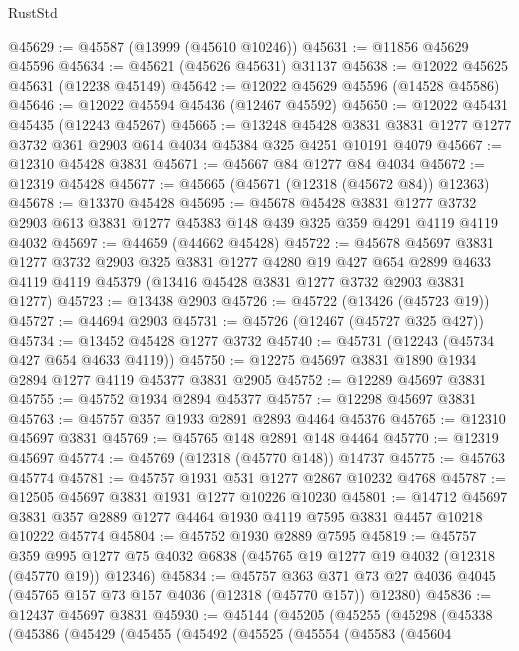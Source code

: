\begin{lexlean}{RustStd}
\begin{coremodule}
@45629 := @45587 (@13999 (@45610 @10246))
@45631 := @11856 @45629 @45596
@45634 := @45621 (@45626 @45631) @31137
@45638 := @12022 @45625 @45631 (@12238 @45149)
@45642 := @12022 @45629 @45596 (@14528 @45586)
@45646 := @12022 @45594 @45436 (@12467 @45592)
@45650 := @12022 @45431 @45435 (@12243 @45267)
@45665 := @13248
    @45428
    @3831
    @3831
    @1277
    @1277
    @3732
    @361
    @2903
    @614
    @4034
    @45384
    @325
    @4251
    @10191
    @4079
@45667 := @12310 @45428 @3831
@45671 := @45667 @84 @1277 @84 @4034
@45672 := @12319 @45428
@45677 := @45665 (@45671 (@12318 (@45672 @84)) @12363)
@45678 := @13370 @45428
@45695 := @45678
    @45428
    @3831
    @1277
    @3732
    @2903
    @613
    @3831
    @1277
    @45383
    @148
    @439
    @325
    @359
    @4291
    @4119
    @4119
    @4032
@45697 := @44659 (@44662 @45428)
@45722 := @45678
    @45697
    @3831
    @1277
    @3732
    @2903
    @325
    @3831
    @1277
    @4280
    @19
    @427
    @654
    @2899
    @4633
    @4119
    @4119
    @45379
    (@13416 @45428 @3831 @1277 @3732 @2903 @3831 @1277)
@45723 := @13438 @2903
@45726 := @45722 (@13426 (@45723 @19))
@45727 := @44694 @2903
@45731 := @45726 (@12467 (@45727 @325 @427))
@45734 := @13452 @45428 @1277 @3732
@45740 := @45731 (@12243 (@45734 @427 @654 @4633 @4119))
@45750 := @12275 @45697 @3831 @1890 @1934 @2894 @1277 @4119 @45377 @3831 @2905
@45752 := @12289 @45697 @3831
@45755 := @45752 @1934 @2894 @45377
@45757 := @12298 @45697 @3831
@45763 := @45757 @357 @1933 @2891 @2893 @4464 @45376
@45765 := @12310 @45697 @3831
@45769 := @45765 @148 @2891 @148 @4464
@45770 := @12319 @45697
@45774 := @45769 (@12318 (@45770 @148)) @14737
@45775 := @45763 @45774
@45781 := @45757 @1931 @531 @1277 @2867 @10232 @4768
@45787 := @12505 @45697 @3831 @1931 @1277 @10226 @10230
@45801 := @14712
    @45697
    @3831
    @357
    @2889
    @1277
    @4464
    @1930
    @4119
    @7595
    @3831
    @4457
    @10218
    @10222
    @45774
@45804 := @45752 @1930 @2889 @7595
@45819 := @45757
    @359
    @995
    @1277
    @75
    @4032
    @6838
    (@45765 @19 @1277 @19 @4032 (@12318 (@45770 @19)) @12346)
@45834 := @45757
    @363
    @371
    @73
    @27
    @4036
    @4045
    (@45765 @157 @73 @157 @4036 (@12318 (@45770 @157)) @12380)
@45836 := @12437 @45697 @3831
@45930 := @45144
    (@45205
      (@45255
        (@45298
          (@45338
            (@45386
              (@45429
                (@45455
                  (@45492
                    (@45525
                      (@45554
                        (@45583
                          (@45604

\end{coremodule}
\end{lexlean}

